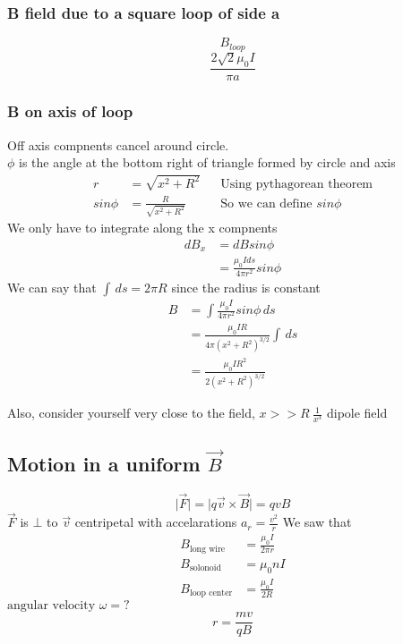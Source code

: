\documentclass{article}
\begin{document}
    \subsubsection{B field due to a square loop of side a}
    $$B_{loop}$$
    $$\frac{2\sqrt{2}\mu_0 I}{\pi a}$$

    \subsubsection{B on axis of loop}
    Off axis compnents cancel around circle. \\
    $\phi$ is the angle at the bottom right of triangle formed by circle and axis
    \begin{align*}
            r &= \sqrt{x^2 + R^2} && \text{Using pythagorean theorem}\\
            sin\phi &= \frac{R}{\sqrt{x^2 +R^2}} && \text{So we can define }sin\phi
    \end{align*}
    We only have to integrate along the x compnents
    \begin{align*}
            dB_x &=dB sin\phi \\
            &= \frac{\mu_0 I ds}{4\pi r^2}sin\phi
    \end{align*}
    We can say that $\int \,ds = 2\pi R $ since the radius is constant\\
    \begin{align*} 
        B &= \int \frac{\mu_0 I}{4\pi r^2}sin\phi \,ds\\
        &= \frac{\mu_0 I R}{4 \pi (x^2+R^2)^{3/2}}\int \,ds\\
        &= \frac{\mu_0 I R^2}{2 (x^2+R^2)^{3/2}}     
    \end{align*}
    
    Also, consider yourself very close to the field, $ x >> R ~ \frac{1}{x^3}$ dipole field
    \subsection{Motion in a uniform $\vec{B}$}
    $$ \lvert \vec{F} \rvert = \lvert q\vec{v} \times \vec{B} \rvert = qvB $$
    $\vec{F}$ is $\bot$ to $\vec{v}$ centripetal with accelarations $a_r = \frac{v^2}{r}$
    We saw that 
    \begin{align*}
        B_{\text{long wire}} &= \frac{\mu_0 I}{2\pi r}\\
        B_{\text{solonoid}} &= \mu_0 n I \\
        B_{\text{loop center}} &= \frac{\mu_0 I}{2R}
    \end{align*}
    $\text{angular velocity } \omega = ?$
    $$r = \frac{mv}{qB}$$
\end{document}
